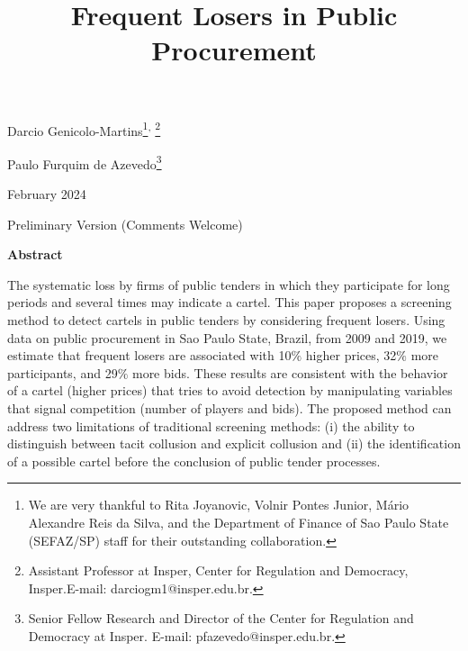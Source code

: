 \documentclass[10pt]{article}
\title{Frequent Losers in Public Procurement}
\begin{document}
\maketitle

\vspace{2\baselineskip}
\begin{center}
Darcio Genicolo-Martins\footnote{ We are very thankful to Rita Joyanovic, Volnir Pontes Junior, Mário Alexandre Reis da Silva, and the Department of Finance of Sao Paulo State (SEFAZ/SP) staff for their outstanding collaboration.}\textsuperscript{,} \footnote{ Assistant Professor at Insper, Center for Regulation and Democracy, Insper.E-mail: darciogm1@insper.edu.br.}
\end{center}


\begin{center}
Paulo Furquim de Azevedo\footnote{ Senior Fellow Research and Director of the Center for Regulation and Democracy at Insper. E-mail: pfazevedo@insper.edu.br.}
\end{center}


\vspace{1\baselineskip}
\begin{center}
February 2024
\end{center}


\begin{center}
Preliminary Version (Comments Welcome)
\end{center}


\vspace{1\baselineskip}

\begin{center}
{\Large\textbf{Abstract}}
\end{center}

The systematic loss by firms of public tenders in which they participate for long periods and several times may indicate a cartel. This paper proposes a screening method to detect cartels in public tenders by considering frequent losers. Using data on public procurement in Sao Paulo State, Brazil, from 2009 and 2019, we estimate that frequent losers are associated with 10$\%$ higher prices, 32$\%$ more participants, and 29$\%$ more bids. These results are consistent with the behavior of a cartel (higher prices) that tries to avoid detection by manipulating variables that signal competition (number of players and bids). The proposed method can address two limitations of traditional screening methods: (i) the ability to distinguish between tacit collusion and explicit collusion and (ii) the identification of a possible cartel before the conclusion of public tender processes.
\end{document}
